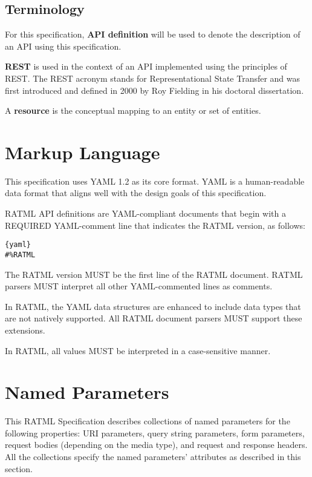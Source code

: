 \subsection{Terminology}

For this specification, \textbf{API definition} will be used to denote the description of an API using this specification. 

\textbf{REST} is used in the context of an API implemented using the principles of REST. The REST acronym stands for Representational State Transfer and was first introduced and defined in 2000 by Roy Fielding in his doctoral dissertation.

A \textbf{resource} is the conceptual mapping to an entity or set of entities.

\section{Markup Language}

This specification uses YAML 1.2 as its core format. YAML is a human-readable data format that aligns well with the design goals of this specification.

RATML API definitions are YAML-compliant documents that begin with a REQUIRED YAML-comment line that indicates the RATML version, as follows:

\begin{lstlisting}[frame=lines]{yaml}
#%RATML
\end{lstlisting}

The RATML version MUST be the first line of the RATML document. RATML parsers MUST interpret all other YAML-commented lines as comments.

In RATML, the YAML data structures are enhanced to include data types that are not natively supported. All RATML document parsers MUST support these extensions.

In RATML, all values MUST be interpreted in a case-sensitive manner.

\section{Named Parameters}

This RATML Specification describes collections of named parameters for the following properties: URI parameters, query string parameters, form parameters, request bodies (depending on the media type), and request and response headers. All the collections specify the named parameters' attributes as described in this section.


